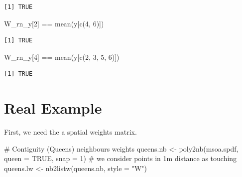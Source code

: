 \documentclass[
  letterpaper,
]{scrbook}
\newenvironment{Shaded}{\begin{snugshade}}{\end{snugshade}}
\newcommand{\AttributeTok}[1]{\textcolor[rgb]{0.40,0.45,0.13}{#1}}
\newcommand{\CommentTok}[1]{\textcolor[rgb]{0.37,0.37,0.37}{#1}}
\newcommand{\ConstantTok}[1]{\textcolor[rgb]{0.56,0.35,0.01}{#1}}
\newcommand{\DecValTok}[1]{\textcolor[rgb]{0.68,0.00,0.00}{#1}}
\newcommand{\FunctionTok}[1]{\textcolor[rgb]{0.28,0.35,0.67}{#1}}
\newcommand{\NormalTok}[1]{\textcolor[rgb]{0.00,0.23,0.31}{#1}}
\newcommand{\OtherTok}[1]{\textcolor[rgb]{0.00,0.23,0.31}{#1}}
\newcommand{\SpecialCharTok}[1]{\textcolor[rgb]{0.37,0.37,0.37}{#1}}
\newcommand{\StringTok}[1]{\textcolor[rgb]{0.13,0.47,0.30}{#1}}
\begin{document}
\begin{verbatim}
[1] TRUE
\end{verbatim}

\begin{Shaded}
\begin{Highlighting}[]
\NormalTok{W\_rn\_y[}\DecValTok{2}\NormalTok{] }\SpecialCharTok{==} \FunctionTok{mean}\NormalTok{(y[}\FunctionTok{c}\NormalTok{(}\DecValTok{4}\NormalTok{, }\DecValTok{6}\NormalTok{)])}
\end{Highlighting}
\end{Shaded}

\begin{verbatim}
[1] TRUE
\end{verbatim}

\begin{Shaded}
\begin{Highlighting}[]
\NormalTok{W\_rn\_y[}\DecValTok{4}\NormalTok{] }\SpecialCharTok{==} \FunctionTok{mean}\NormalTok{(y[}\FunctionTok{c}\NormalTok{(}\DecValTok{2}\NormalTok{, }\DecValTok{3}\NormalTok{, }\DecValTok{5}\NormalTok{, }\DecValTok{6}\NormalTok{)])}
\end{Highlighting}
\end{Shaded}

\begin{verbatim}
[1] TRUE
\end{verbatim}

\hypertarget{real-example}{%
\section{Real Example}\label{real-example}}

First, we need the a spatial weights matrix.

\begin{Shaded}
\begin{Highlighting}[]
\CommentTok{\# Contiguity (Queens) neighbours weights}
\NormalTok{queens.nb }\OtherTok{\textless{}{-}} \FunctionTok{poly2nb}\NormalTok{(msoa.spdf, }
                     \AttributeTok{queen =} \ConstantTok{TRUE}\NormalTok{, }
                     \AttributeTok{snap =} \DecValTok{1}\NormalTok{) }\CommentTok{\# we consider points in 1m distance as \textquotesingle{}touching\textquotesingle{}}
\NormalTok{queens.lw }\OtherTok{\textless{}{-}} \FunctionTok{nb2listw}\NormalTok{(queens.nb,}
                      \AttributeTok{style =} \StringTok{"W"}\NormalTok{)}
\end{Highlighting}
\end{Shaded}
\end{document}
